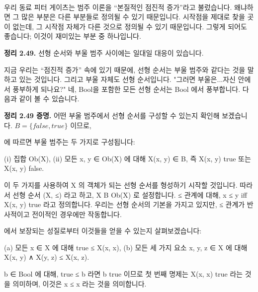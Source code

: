 \documentclass[11pt, a4paper, twoside, openany]{book}
\begin{document}
{\

\par\medskip
우리 동료 피터 게이츠는 범주 이론을 “본질적인 점진적 증가”라고 불렀습니다. 왜냐하면 그 많은 부분은 다른 부분들로 정의될 수 있기 때문입니다. 시작점을 제대로 찾을 곳이 없는데, 그 시작점 자체가 다른 것으로 정의될 수 있기 때문입니다. 그렇게 되어도 좋습니다; 이것이 재미있는 부분 중 하나입니다.

\par\medskip
\textbf{정리 2.49.} 선형 순서와 부울 범주 사이에는 일대일 대응이 있습니다.

\par\medskip
지금 우리는 “점진적 증가” 속에 있기 때문에, 선형 순서는 부울 범주와 같다는 것을 말하고 있는 것입니다. 그리고 부울 자체도 선형 순서입니다. "그러면 부울은...자신 안에서 풍부하게 되나요?" 네, Bool\hspace{0pt}을 포함한 모든 선형 순서는  Bool 에서 풍부합니다. 다음과 같이 볼 수 있습니다.

\par\medskip
\textbf{정리 2.49 증명.} 어떤 부울 범주에서 선형 순서를 구성할 수 있는지 확인해 보겠습니다. $B = \{false, true\}$ 이므로, 
\begin{definitionbox}[정의 2.46]
\hspace{0pt}에 따르면 부울 범주는 두 가지로 구성됩니다:
\end{definitionbox}

\par\medskip
(i) 집합 Ob(X),
(ii) 모든 x, y ∈ Ob(X) 에 대해 X(x, y) ∈ B, 즉 X(x, y)  true 또는 X(x, y)  false.

\par\medskip
이 두 가지를 사용하여 X 의 객체가 되는 선형 순서를 형성하기 시작할 것입니다. 따라서 선형 순서 (X, ≤) 라고 하고, X B Ob(X) 로 설정합니다. ≤ 관계에 대해, x ≤ y  iff X(x, y)  true 라고 정의합니다. 우리는 선형 순서의 기본을 가지고 있지만, ≤ 관계가 반사적이고 전이적인 경우에만 작동합니다. 
\begin{definitionbox}[정의 2.46]
\hspace{0pt}에서 보장되는 성질로부터 이것들을 얻을 수 있는지 살펴보겠습니다:
\end{definitionbox}

\par\medskip
(a) 모든 x ∈ X 에 대해 true ≤ X(x, x),
(b) 모든 세 가지 요소 x, y, z ∈ X 에 대해 X(x, y) ∧ X(y, z) ≤ X(x, z).

\par\medskip
b ∈ Bool 에 대해, true ≤ b 라면 b  true 이므로 첫 번째 명제는 X(x, x)  true 라는 것을 의미하며, 이것은 x ≤ x 라는 것을 의미합니다.

}
\end{document}
